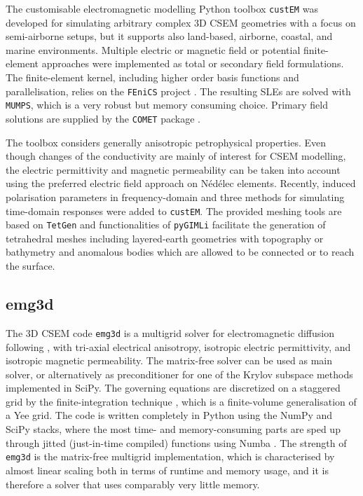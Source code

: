 \documentclass[
    paper,
  ]{geophysics}
\newcommand{\emg}[2]{\texttt{emg#1#2}\xspace}
\newcommand{\custem}{\texttt{custEM}\xspace}
\begin{document}
The customisable electromagnetic modelling Python toolbox \custem was developed for simulating arbitrary complex 3D CSEM geometries with a focus on semi-airborne setups, but it supports also land-based, airborne, coastal, and marine environments. Multiple electric or magnetic field or potential finite-element approaches were implemented as total or secondary field formulations. The finite-element kernel, including higher order basis functions and parallelisation, relies on the \texttt{FEniCS} project \citep{B.SPR.12.Logg, B.SPR.16.Langtangen}. The resulting SLEs are solved with \texttt{MUMPS}, which is a very robust but memory consuming choice. Primary field solutions are supplied by the \texttt{COMET} package \citep{GEO.20.Skibbe}.

The toolbox considers generally anisotropic petrophysical properties. Even though changes of the conductivity are mainly of interest for CSEM modelling, the electric permittivity and magnetic permeability can be taken into account using the preferred electric field approach on Nédélec elements. Recently, induced polarisation parameters in frequency-domain and three methods for simulating time-domain responses were added to \custem. The provided meshing tools are based on \texttt{TetGen} \citep{TOM.15.Si} and functionalities of \texttt{pyGIMLi} facilitate the generation of tetrahedral meshes including layered-earth geometries with topography or bathymetry and anomalous bodies which are allowed to be connected or to reach the surface.

\subsection{emg3d}

The 3D CSEM code \emg3d is a multigrid solver \citep{CMMP.64.Fedorenko} for electromagnetic diffusion following \cite{GP.06.Mulder}, with tri-axial electrical anisotropy, isotropic electric permittivity, and isotropic magnetic permeability. The matrix-free solver can be used as main solver, or alternatively as preconditioner for one of the Krylov subspace methods implemented in SciPy. The governing equations are discretized on a staggered grid by the finite-integration technique \citep{AEU.77.Weiland}, which is a finite-volume generalisation of a Yee grid. The code is written completely in Python using the NumPy and SciPy stacks, where the most time- and memory-consuming parts are sped up through jitted (just-in-time compiled) functions using Numba \citep{LLVM.15.Lam}. The strength of \emg3d is the matrix-free multigrid implementation, which is characterised by almost linear scaling both in terms of runtime and memory usage, and it is therefore a solver that uses comparably very little memory.
\end{document}
